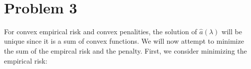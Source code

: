 \documentclass[11pt]{article}
\begin{document}
\begin{center}

\ \\
\end{center}


\section*{Problem 3}

\noindent
For convex empirical risk and convex penalities, the solution of 
$\hat{a}(\lambda)$ will be unique since it is a sum of convex functions. We 
will now attempt to minimize the sum of the empircal risk and the penalty. 
First, we consider minimizing the empirical risk:
\end{document}
